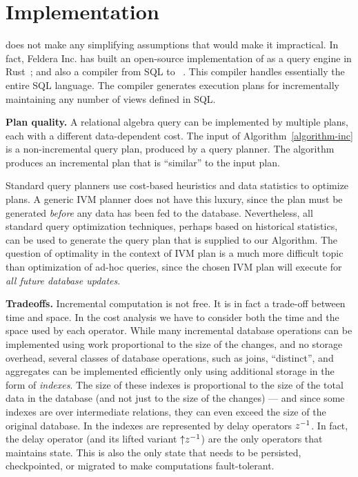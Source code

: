 \section{Implementation}\label{sec:implementation}


\dbsp does not make any simplifying assumptions that would make it
impractical.  In fact, Feldera Inc. has built an open-source
implementation of \dbsp as a query engine in Rust~\cite{dbsp-crate};
and also a compiler from SQL to \dbsp~\cite{sql-to-dbsp-compiler}.
This compiler handles essentially the entire SQL language.  The
compiler generates execution plans for incrementally maintaining any
number of views defined in SQL.

\textbf{Plan quality.}  A relational algebra query can be implemented
by multiple plans, each with a different data-dependent cost.  The
input of Algorithm~\ref{algorithm-inc} is a non-incremental query
plan, produced by a query planner.  The algorithm produces an
incremental plan that is ``similar'' to the input plan.

Standard query planners use cost-based heuristics and data statistics
to optimize plans.  A generic IVM planner does not have this luxury,
since the plan must be generated \emph{before} any data has been fed
to the database.  Nevertheless, all standard query optimization
techniques, perhaps based on historical statistics, can be used to
generate the query plan that is supplied to our Algorithm.  The
question of optimality in the context of IVM plan is a much more
difficult topic than optimization of ad-hoc queries, since the chosen
IVM plan will execute for \emph{all future database updates}.

\textbf{Tradeoffs.}  Incremental computation is not free.  It is in
fact a trade-off between time and space.  In the cost analysis we have
to consider both the time and the space used by each operator.  While
many incremental database operations can be implemented using work
proportional to the size of the changes, and no storage overhead,
several classes of database operations, such as joins, ``distinct'',
and aggregates can be implemented efficiently only using additional
storage in the form of \emph{indexes}.  The size of these indexes is
proportional to the size of the total data in the database (and not
just to the size of the changes) --- and since some indexes are over
intermediate relations, they can even exceed the size of the original
database.  In \dbsp the indexes are represented by delay operators
$z^{-1}$.  In fact, the delay operator (and its lifted variant
${\uparrow}z^{-1}$) are the only operators that maintains state.  This is
also the only state that needs to be persisted, checkpointed, or
migrated to make \dbsp computations fault-tolerant.

